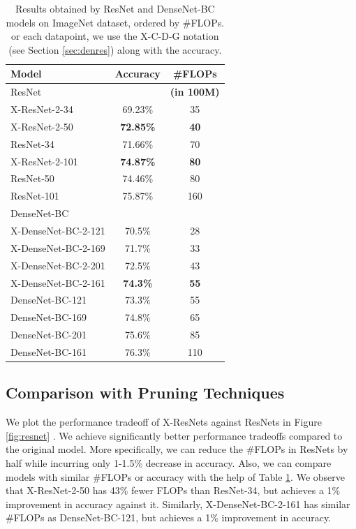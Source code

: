  
\begin{table}
\centering
\begin{tabular}{|l|c|c|}
\hline
{\bf Model} & {\bf Accuracy}  & {\bf \#FLOPs}\\
\hline
ResNet &   & {\bf(in 100M)}\\
\hline
X-ResNet-2-34 & 69.23\%  & 35\\
X-ResNet-2-50 & {\bf 72.85\%}  & {\bf 40}\\
ResNet-34 & 71.66\%  & 70\\
X-ResNet-2-101 & {\bf 74.87\%}  & {\bf 80}\\
ResNet-50 & 74.46\%  & 80\\
ResNet-101 & 75.87\%  & 160\\
\hline
DenseNet-BC &  &   \\
\hline
X-DenseNet-BC-2-121 & 70.5\% & 28\\
X-DenseNet-BC-2-169 & 71.7\% & 33\\
X-DenseNet-BC-2-201 & 72.5\% & 43\\
X-DenseNet-BC-2-161 & {\bf 74.3\%} & {\bf 55}\\
DenseNet-BC-121 & 73.3\% & 55\\
DenseNet-BC-169 & 74.8\% & 65\\
DenseNet-BC-201 & 75.6\% & 85\\
DenseNet-BC-161 & 76.3\% & 110\\
\hline
\end{tabular}
      \caption{Results obtained by ResNet and DenseNet-BC models on ImageNet dataset, ordered by \#FLOPs. or each datapoint, we use the X-C-D-G notation (see Section \ref{sec:denres}) along with the accuracy.}
\label{tab:imagenet}
\end{table}
\subsection{Comparison with Pruning Techniques}
\label{sec:prun}

\noindent We plot the performance tradeoff of X-ResNets against ResNets in Figure \ref{fig:resnet} . We achieve significantly better performance tradeoffs compared to the original model. More specifically, we can reduce the \#FLOPs in ResNets by half while incurring only 1-1.5\% decrease in accuracy. Also, we can compare models with similar \#FLOPs or accuracy with the help of Table \ref{tab:imagenet}. We observe that  X-ResNet-2-50 has 43\% fewer FLOPs than ResNet-34, but achieves a 1\% improvement in accuracy against it. Similarly, X-DenseNet-BC-2-161 has similar \#FLOPs as DenseNet-BC-121, but achieves a 1\% improvement in accuracy. \\ 

